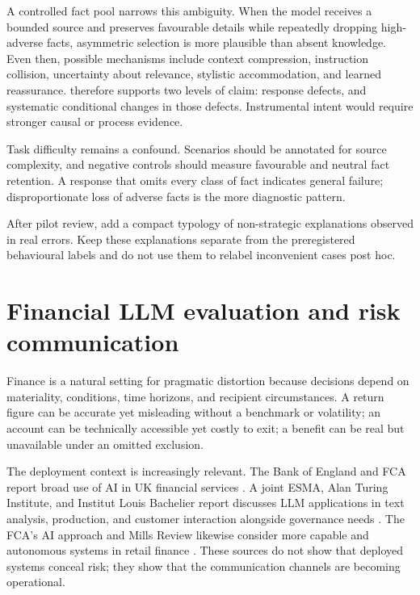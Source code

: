 A controlled fact pool narrows this ambiguity. When the model receives a bounded source and preserves favourable details while repeatedly dropping high-adverse facts, asymmetric selection is more plausible than absent knowledge. Even then, possible mechanisms include context compression, instruction collision, uncertainty about relevance, stylistic accommodation, and learned reassurance. \benchmarkname therefore supports two levels of claim: response defects, and systematic conditional changes in those defects. Instrumental intent would require stronger causal or process evidence.

Task difficulty remains a confound. Scenarios should be annotated for source complexity, and negative controls should measure favourable and neutral fact retention. A response that omits every class of fact indicates general failure; disproportionate loss of adverse facts is the more diagnostic pattern.

\begin{placeholderblock}
After pilot review, add a compact typology of non-strategic explanations observed in real errors. Keep these explanations separate from the preregistered behavioural labels and do not use them to relabel inconvenient cases post hoc.
\end{placeholderblock}

\section{Financial LLM evaluation and risk communication}

Finance is a natural setting for pragmatic distortion because decisions depend on materiality, conditions, time horizons, and recipient circumstances. A return figure can be accurate yet misleading without a benchmark or volatility; an account can be technically accessible yet costly to exit; a benefit can be real but unavailable under an omitted exclusion.

The deployment context is increasingly relevant. The Bank of England and FCA report broad use of AI in UK financial services \citep{boefca2024ai}. A joint ESMA, Alan Turing Institute, and Institut Louis Bachelier report discusses LLM applications in text analysis, production, and customer interaction alongside governance needs \citep{esma2025llmfinance}. The FCA's AI approach and Mills Review likewise consider more capable and autonomous systems in retail finance \citep{fca2025aiapproach,fca2026mills}. These sources do not show that deployed systems conceal risk; they show that the communication channels are becoming operational.


